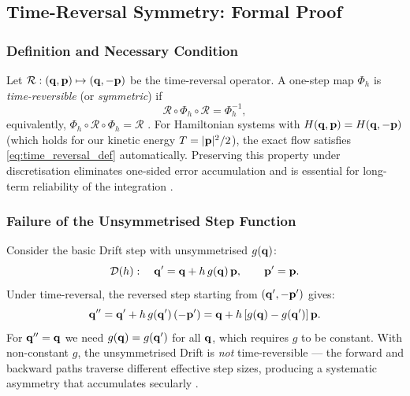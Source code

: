 
\subsection{Time-Reversal Symmetry: Formal Proof}
\label{sec:time_reversal_proof}

\subsubsection{Definition and Necessary Condition}
\label{sec:time_reversal_def}

Let $\mathcal{R}: (\mathbf{q}, \mathbf{p}) \mapsto (\mathbf{q}, -\mathbf{p})$ be the
time-reversal operator. A one-step map $\Phi_h$ is
\textit{time-reversible} (or \textit{symmetric}) if
\begin{equation}
  \mathcal{R} \circ \Phi_h \circ \mathcal{R} = \Phi_h^{-1},
  \label{eq:time_reversal_def}
\end{equation}
equivalently, $\Phi_h \circ \mathcal{R} \circ \Phi_h = \mathcal{R}$
\citep[Definition~II.2.1]{HairerLubichWanner2006}.
For Hamiltonian systems with $H(\mathbf{q},\mathbf{p}) = H(\mathbf{q},-\mathbf{p})$
(which holds for our kinetic energy $T = |\mathbf{p}|^2/2$), the
exact flow satisfies \eqref{eq:time_reversal_def} automatically.
Preserving this property under discretisation eliminates
one-sided error accumulation and is essential for long-term
reliability of the integration
\citep{PretoTremaine1999,HernandezZeebeHadden2022}.

\subsubsection{Failure of the Unsymmetrised Step Function}
\label{sec:asymmetric_failure}

Consider the basic Drift step with unsymmetrised $g(\mathbf{q})$:
\begin{equation}
  \mathcal{D}(h):\quad
  \mathbf{q}' = \mathbf{q} + h\,g(\mathbf{q})\,\mathbf{p}, \qquad \mathbf{p}' = \mathbf{p}.
  \label{eq:drift_basic}
\end{equation}
Under time-reversal, the reversed step starting from
$(\mathbf{q}', -\mathbf{p}')$ gives:
\begin{equation}
  \mathbf{q}'' = \mathbf{q}' + h\,g(\mathbf{q}')\,(-\mathbf{p}')
        = \mathbf{q} + h\,[g(\mathbf{q}) - g(\mathbf{q}')]\,\mathbf{p}.
\end{equation}
For $\mathbf{q}'' = \mathbf{q}$ we need $g(\mathbf{q}) = g(\mathbf{q}')$ for all $\mathbf{q}$, which
requires $g$ to be constant. With non-constant $g$, the unsymmetrised
Drift is \textit{not} time-reversible — the forward and backward
paths traverse different effective step sizes, producing a systematic
asymmetry that accumulates secularly
\citep{PretoTremaine1999}.

